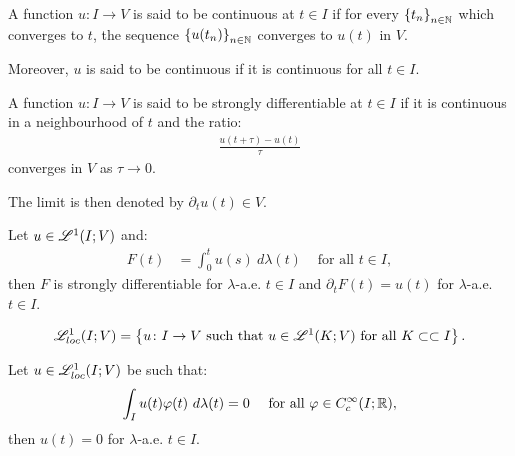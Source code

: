 \begin{definition}[Continuity]
    A function $u\colon I \rightarrow V$ is said to be continuous at $t \in I$ if for every $\left\{ t_n \right\}_{n \in \mathbb{N}}$ which converges to $t$, the sequence $\left\{ u(t_n) \right\}_{n \in \mathbb{N}}$ converges to $u(t)$ in $V$.

    Moreover, $u$ is said to be continuous if it is continuous for all $t \in I$.
\end{definition}

\begin{definition}
    A function $u\colon I \rightarrow V$ is said to be strongly differentiable at $t \in I$ if it is continuous in a neighbourhood of $t$ and the ratio:
    \begin{align}
        \frac{u(t + \tau) - u(t)}{\tau}
    \end{align}
    converges in $V$ as $\tau \rightarrow 0$.

    The limit is then denoted by $\partial_t u(t) \in V$.
\end{definition}

\begin{theorem}
    Let $u \in \mathscr{L}^{1}(I; V)$ and:
    \begin{align}
        F(t) &= \int_0^t u(s) ~ d \lambda(t) &\text{ for all } t \in I,
    \end{align}
    then $F$ is strongly differentiable for $\lambda$-a.e. $t \in I$ and $\partial_t F(t) = u(t)$ for $\lambda$-a.e. $t \in I$.
\end{theorem}

\begin{definition}
    \begin{align}
        \mathscr{L}^{1}_{loc}(I; V) = \left\{ u\colon I \rightarrow V  \text{ such that } u \in \mathscr{L}^{1}(K; V) \text{ for all } K \subset \subset I \right\}.
    \end{align}
\end{definition}

\begin{corollary}
    Let $u \in \mathscr{L}^{1}_{loc}(I; V)$ be such that:
    \begin{align}
        \int_I u(t) \varphi(t) ~ d \lambda(t) &= 0 &\text{ for all } \varphi \in C_c^{\infty}(I; \mathbb{R}),
    \end{align}
    then $u(t) = 0$ for $\lambda$-a.e. $t \in I$.
\end{corollary}

